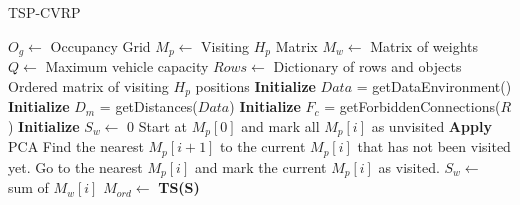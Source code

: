 \documentclass[conference]{IEEEtran}
\begin{document}
\begin{algorithm}[t!]
\caption{TSP-CVRP}
\label{Alg::TSP}
\begin{algorithmic}[1]
\Require
\State $O_{g} \gets$ Occupancy Grid
\State $M_{p} \gets$ Visiting $H_{p}$  Matrix
\State $M_{w} \gets$ Matrix of weights
\State $Q \gets$ Maximum vehicle capacity
\State $Rows \gets$ Dictionary of rows and objects
\Ensure
\State Ordered matrix of visiting $H_{p}$  positions
\State \textbf{Initialize} $Data $ = getDataEnvironment() 
\State \textbf{Initialize} $D_{m} $ = getDistances($Data$) 
\State \textbf{Initialize} $F_{c} $ = getForbiddenConnections($R$) 
\State \textbf{Initialize} $S_{w} \gets$ 0 
\State Start at $M_{p}[0]$ and mark all $M_{p}[i]$ as unvisited
\State \textbf{Apply} PCA  
\State Find the nearest $M_{p}[i+1]$ to the current $M_{p}[i]$ that has not been visited yet.
\State Go to the nearest $M_{p}[i]$ and mark the current $M_{p}[i]$ as visited.
\State $S_{w} \gets$ sum of $M_{w}[i]$
\EndIf
\EndIf
\EndWhile
\State $M_{ord} \gets$  \textbf{TS(S)} 
\end{algorithmic}
\end{algorithm}
\end{document}
